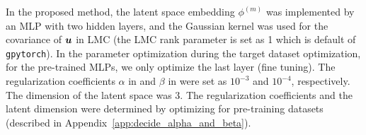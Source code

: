In the proposed method, the latent space embedding $\phi^{(m)}$ was implemented by an MLP with two hidden layers, and the Gaussian kernel was used for the covariance of $\boldsymbol{u}$ in LMC (the LMC rank parameter is set as 1 which is default of {\tt gpytorch}). 
%
In the parameter optimization  during the target dataset optimization, for the pre-trained MLPs, we only optimize the last layer (fine tuning).
%
%
%
The regularization coefficients 
$\alpha$ 
in  and 
$\beta$ 
in  were set as $10^{-3}$ and $10^{-4}$, respectively.
%
The dimension of the latent space was $3$.
%
The regularization coefficients and the latent dimension were determined by optimizing for pre-training datasets (described in Appendix~\ref{app:decide_alpha_and_beta}).
%

